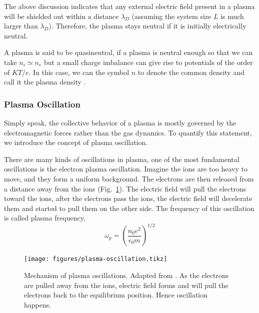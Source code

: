 The above discussion indicates that any external electric field present in a plasma will be shielded out within a distance $\lambda_D$ (assuming the system size $L$ is much larger than $\lambda_D$). Therefore, the plasma stays neutral if it is initially electrically neutral.

A plasma is said to be quasineutral, if a plasma is neutral enough so that we can take $n_i \simeq n_e$ but a small charge imbalance can give rise to potentials of the order of $KT/e$. In this case, we can the symbol $n$ to denote the common density and call it the plasma density \cite{chen_introduction_2016}.

\subsubsection*{Plasma Oscillation}
Simply speak, the collective behavior of a plasma is mostly governed by the electromagnetic forces rather than the gas dynamics. To quantify this statement, we introduce the concept of plasma oscillation.

There are many kinds of oscillations in plasma, one of the most fundamental oscillations is the electron plasma oscillation. Imagine the ions are too heavy to move, and they form a uniform background. The electrons are then released from a distance away from the ions (Fig.~\ref{fig:plasma-oscillation}). The electric field will pull the electrons toward the ions, after the electrons pass the ions, the electric field will decelerate them and started to pull them on the other side. The frequency of this oscillation is called plasma frequency,
\begin{equation}
	\omega_p = \left(\frac{n_0e^2}{\epsilon_0m}\right)^{1/2}
\end{equation}

\begin{figure}[htbp]
	\centering
	\texttt{[image: figures/plasma-oscillation.tikz]}
	\caption{Mechanism of plasma oscillations. Adapted from \cite{chen_introduction_2016}. As the electrons are pulled away from the ions, electric field forms and will pull the electrons back to the equilibrium position. Hence oscillation happens.}
	\label{fig:plasma-oscillation}
\end{figure}

